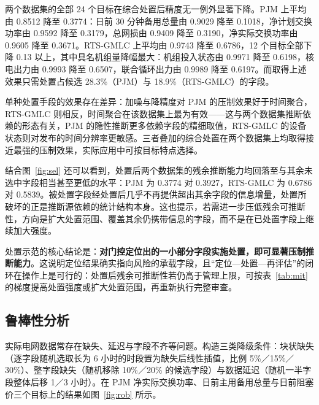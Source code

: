 \documentclass[UTF8,zihao=5,twoside]{ctexart}
\begin{document}
两个数据集的全部 24 个目标在综合处置后精度无一例外显著下降。PJM 上平均由 0.8512 降至 0.3774：日前 30 分钟备用总量由 0.9029 降至 0.1018，净计划交换功率由 0.9592 降至 0.3179，总网损由 0.9409 降至 0.3190，净实际交换功率由 0.9605 降至 0.3671。RTS-GMLC 上平均由 0.9743 降至 0.6786，12 个目标全部下降 0.13 以上，其中具名机组量降幅最大：机组投入状态由 0.9971 降至 0.6198，核电出力由 0.9993 降至 0.6507，联合循环出力由 0.9989 降至 0.6197。而取得上述效果只需处置占候选 28.3\%（PJM）与 18.9\%（RTS-GMLC）的字段。

单种处置手段的效果存在差异：加噪与降精度对 PJM 的压制效果好于时间聚合，RTS-GMLC 则相反，时间聚合在该数据集上最为有效——这与两个数据集推断依赖的形态有关，PJM 的隐性推断更多依赖字段的精细取值，RTS-GMLC 的设备状态则对发布的时间分辨率更敏感。三者叠加的综合处置在两个数据集上均取得接近最强的压制效果，实际应用中可按目标特点选择。

结合图~\ref{fig:sel} 还可以看到，处置后两个数据集的残余推断能力均回落至与其余未选中字段相当甚至更低的水平：PJM 为 0.3774 对 0.3927，RTS-GMLC 为 0.6786 对 0.5839。被处置字段经处置后几乎不再提供超出其余字段的信息增量，处置所破坏的正是推断源依赖的统计结构本身。这也提示，若需进一步压低残余可推断性，方向是扩大处置范围、覆盖其余仍携带信息的字段，而不是在已处置字段上继续加大强度。

处置示范的核心结论是：\textbf{对门控定位出的一小部分字段实施处置，即可显著压制推断能力}。这说明定位结果确实指向风险的承载字段，且“定位—处置—再评估”的闭环在操作上是可行的：处置后残余可推断性若仍高于管理上限，可按表~\ref{tab:mit} 的梯度提高处置强度或扩大处置范围，再重新执行完整审查。

\FloatBarrier
\subsection{鲁棒性分析}

实际电网数据常存在缺失、延迟与字段不齐等问题。构造三类降级条件：块状缺失（逐字段随机选取长为 6 小时的时段置为缺失后线性插值，比例 5\%／15\%／30\%）、整字段缺失（随机移除 10\%／20\% 的候选字段）与数据延迟（随机一半字段整体后移 1／3 小时）。在 PJM 净实际交换功率、日前主用备用总量与日前阻塞价三个目标上的结果如图~\ref{fig:rob} 所示。
\end{document}
